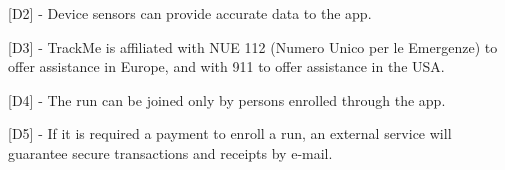 \hspace{-\parindent}[D2] - Device sensors can provide accurate data to the app. \newline

\hspace{-\parindent}[D3] - TrackMe is affiliated with NUE 112 (Numero Unico per le Emergenze) to offer assistance in Europe, and with 911 to offer assistance in the USA. \newline

\hspace{-\parindent}[D4] - The run can be joined only by persons enrolled through the app. \newline

\hspace{-\parindent}[D5] - If it is required a payment to enroll a run, an external service will guarantee secure transactions and receipts by e-mail. \newline

%